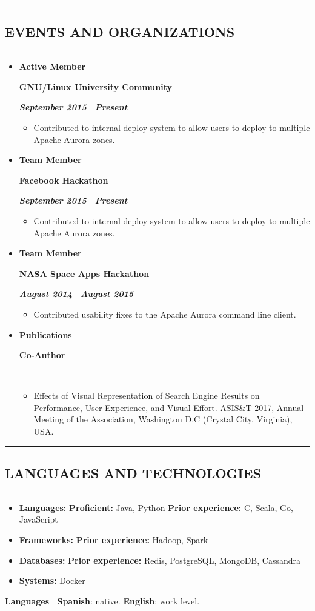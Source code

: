 \documentclass[10pt,letterpaper]{article}
\newcommand{\textbox}[1]{
  \parbox{.333\textwidth}{#1}
}
\newcommand{\CPP}
{C\nolinebreak[4]\hspace{-.05em}\raisebox{.22ex}{\footnotesize\bf ++}}
\newcommand{\sectionTitle}[1]{
  \hrule
  \vspace{-1.0em} 
  \subsection*{\uppercase{\textbf{#1}}}
  \vspace{-0.3em}
    \hrule
    \vspace{0.3em}  
}
\newcommand{\languageSection}[4]{
  \vspace{-0.5em}
  \begin{center}
    \textbf{Languages \textendash \ }\textbf{#1}: #2. \textbf{#3}: #4.
  \end{center}
}
\newcommand{\titleExperienceWithoutLocation}[4]{
  \vspace{1.0em}
  \item[]
  {
    \textbox{\textbf{#1}\hfill}\textbox{\hfil \textbf{#2}\hfil}\hfill \textbf{\emph{#3 \textendash \ #4}}
  }
}
\begin{document}
  \vspace{0.30em} 
  \sectionTitle{Events and Organizations}
  \vspace{-0.8em}
  \begin{itemize}
    \parskip=-0.6em 
    \titleExperienceWithoutLocation{Active Member}{GNU/Linux University Community}{September 2015}{Present}
      \begin{itemize}[label=\textbullet]
        \itemsep0em
        \item Contributed to internal deploy system to allow users to deploy to multiple Apache Aurora zones.
      \end{itemize}
  
    \vspace{-0.5em} 
    \titleExperienceWithoutLocation{Team Member}{Facebook Hackathon}{September 2015}{Present}
      \begin{itemize}[label=\textbullet]
        \itemsep0em
        \item Contributed to internal deploy system to allow users to deploy to multiple Apache Aurora zones.
      \end{itemize}
  
    \vspace{-0.5em} 
    \titleExperienceWithoutLocation{Team Member}{NASA Space Apps Hackathon}{August 2014}{August 2015}
      \begin{itemize}[label=\textbullet]
        \itemsep0em
        \item Contributed usability fixes to the Apache Aurora command line client.
      \end{itemize}

    \vspace{-0.5em} 
    \titleExperienceWithoutLocation{Publications}{Co-Author}{}{}
      \begin{itemize}[label=\textbullet]
        \itemsep0em
        \item Effects of Visual Representation of Search Engine Results on Performance, User Experience, and Visual Effort. ASIS\&T 2017,  Annual Meeting of the Association, Washington D.C (Crystal City, Virginia), USA.
      \end{itemize}
    \end{itemize} 
  \vspace{0.30em} 
  
  
  \sectionTitle{Languages and Technologies}
  \vspace{0.20em}
  \begin{itemize}[label=\textbullet]
    \itemsep0em
    \item \textbf{Languages:} \textbf{Proficient:} Java, Python \textbf{Prior experience:} \CPP, Scala, Go, JavaScript
    \item \textbf{Frameworks:} \textbf{Prior experience:} Hadoop, Spark
    \item \textbf{Databases:} \textbf{Prior experience:} Redis, PostgreSQL, MongoDB, Cassandra
    \item \textbf{Systems:} Docker
  \end{itemize}
  
  \languageSection{Spanish}{native}{English}{work level}
  
\end{document}
